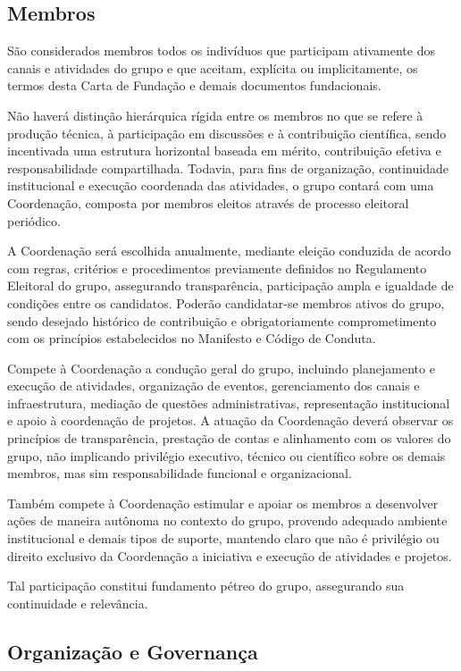 \documentclass[
  12pt,          %
  a4paper,       %
  oneside,       %
  brazil         %
]{article}
\begin{document}
\subsection{Membros}

São considerados membros todos os indivíduos que participam ativamente dos canais e atividades do grupo e que aceitam, 
explícita ou implicitamente, os termos desta Carta de Fundação e demais documentos fundacionais.

Não haverá distinção hierárquica rígida entre os membros no que se refere à produção técnica, 
à participação em discussões e à contribuição científica, sendo incentivada uma estrutura horizontal baseada em mérito, 
contribuição efetiva e responsabilidade compartilhada. Todavia, para fins de organização, continuidade institucional e 
execução coordenada das atividades, o grupo contará com uma Coordenação, composta por membros eleitos através de processo eleitoral periódico.

A Coordenação será escolhida anualmente, mediante eleição conduzida de acordo com regras, critérios e procedimentos previamente definidos no 
Regulamento Eleitoral do grupo, assegurando transparência, participação ampla e igualdade de condições entre os candidatos. 
Poderão candidatar-se membros ativos do grupo, sendo desejado histórico de contribuição e obrigatoriamente comprometimento com os princípios estabelecidos 
no Manifesto e Código de Conduta.

Compete à Coordenação a condução geral do grupo, incluindo planejamento e execução de atividades, organização de eventos, 
gerenciamento dos canais e infraestrutura, mediação de questões administrativas, representação institucional e apoio à coordenação de projetos. 
A atuação da Coordenação deverá observar os princípios de transparência, prestação de contas e alinhamento com os 
valores do grupo, não implicando privilégio executivo, técnico ou científico sobre os demais membros, mas sim responsabilidade funcional e organizacional.


Também compete à Coordenação estimular e apoiar os membros a desenvolver ações de maneira autônoma no contexto do grupo, provendo adequado ambiente  
institucional e demais tipos de suporte, mantendo claro que não é privilégio ou direito exclusivo da Coordenação a iniciativa e execução de atividades e projetos. 


Tal participação constitui fundamento pétreo do grupo, assegurando sua continuidade e relevância. 

\subsection{Organização e Governança}
\end{document}
